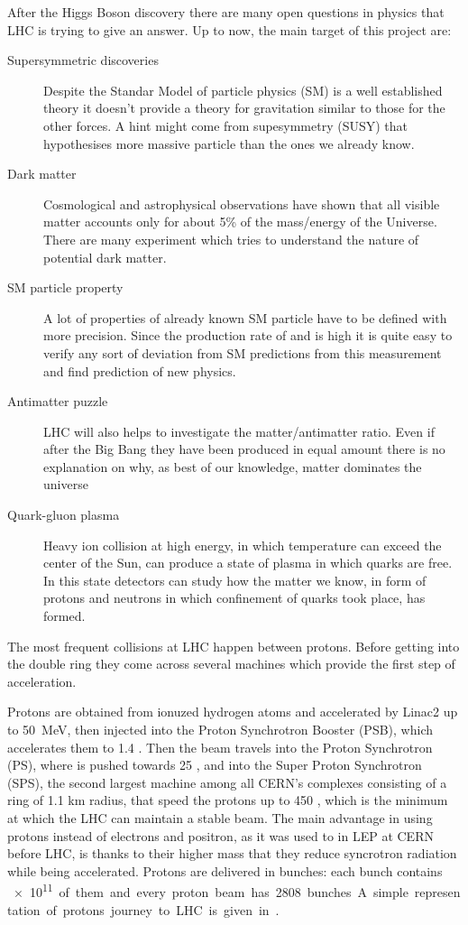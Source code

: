 After the Higgs Boson discovery there are many open questions in physics that LHC is trying to give an answer. Up to now, the main target of this project are:
\begin{description}
\item[Supersymmetric discoveries] Despite the Standar Model of particle physics (SM) is a well established theory it doesn't provide a theory for gravitation similar to those for the other forces. A hint might come from supesymmetry (SUSY) that hypothesises more massive particle than the ones we already know.
\item[Dark matter] Cosmological and astrophysical observations have shown that all visible matter accounts only for about 5\% of the mass/energy of the Universe. There are many experiment which tries to understand the nature of potential dark matter.
\item[SM particle property] A lot of properties of already known SM particle have to be defined with more precision. Since the production rate of \Wboson and \Zboson is high it is quite easy to verify any sort of deviation from SM predictions from this measurement and find prediction of new physics.
\item[Antimatter puzzle] LHC will also helps to investigate the matter/antimatter ratio. Even if after the Big Bang they have been produced in equal amount there is no explanation on why, as best of our knowledge, matter dominates the universe
\item[Quark-gluon plasma] Heavy ion collision at high energy, in which temperature can exceed the center of the Sun, can produce a state of plasma in which quarks are free. In this state detectors can study how the matter we know, in form of protons and neutrons in which confinement of quarks took place, has formed.
\end{description}

The most frequent collisions at LHC happen between protons. Before getting into the double ring they come across several machines which provide the first step of acceleration.

Protons are obtained from ionuzed hydrogen atoms and accelerated by Linac2 up to \SI{50}{MeV}, then injected into the Proton Synchrotron Booster (PSB), which accelerates them to 1.4 \GeV. Then the beam travels into the Proton Synchrotron (PS), where is pushed towards 25 \GeV, and into the Super Proton Synchrotron (SPS),  the second largest machine among all CERN's complexes consisting of a ring of 1.1 km radius, that speed the protons up to 450 \GeV, which is the minimum at which the LHC can maintain a stable beam. The main advantage in using protons instead of electrons and positron, as it was used to in LEP at CERN before LHC, is thanks to their higher mass that they reduce syncrotron radiation while being accelerated. Protons are delivered in bunches: each bunch contains \SI{e11} of them and every proton beam has 2808 bunches. A simple representation of protons journey to LHC is given in \Fig{\ref{fig:accelerators}}.

